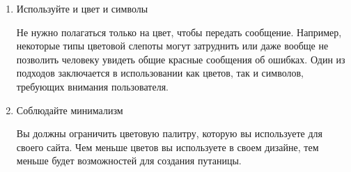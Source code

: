 \begin{enumerate}
    \item Используйте и цвет и символы

Не нужно полагаться только на цвет, чтобы передать сообщение. Например, некоторые типы цветовой слепоты могут затруднить или даже вообще не позволить человеку увидеть общие красные сообщения об ошибках. Один из подходов заключается в использовании как цветов, так и символов, требующих внимания пользователя.

\noindent
\begin{minipage}{\linewidth}
\end{minipage}
\bigskip

\item Соблюдайте минимализм

    Вы должны ограничить цветовую палитру, которую вы используете для своего сайта. Чем меньше цветов вы используете в своем дизайне, тем меньше будет возможностей для создания путаницы.


\end{enumerate}
